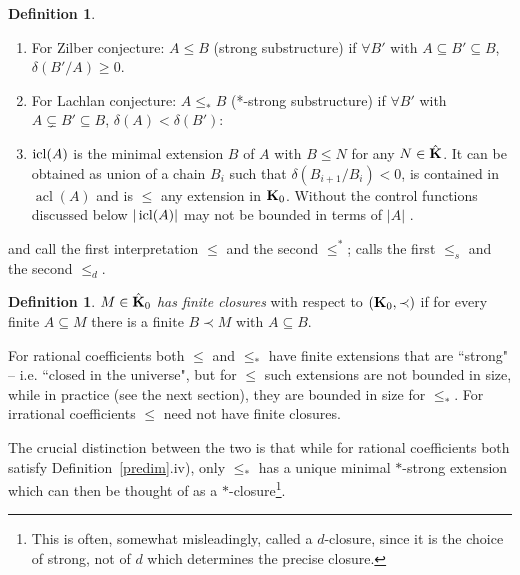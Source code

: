 \documentclass[11pt]{amsart}
\def\bK{{\bf K}}
\def\icl{\mathop{\rm icl}}
\DeclareMathOperator{\acl}{acl}
\theoremstyle{definition}
\newtheorem{definition}[theorem]{Definition}
\theoremstyle{remark}
\numberwithin{equation}{section}
\begin{document}
\begin{definition}\label{defsstr} \begin{enumerate}


     \item For Zilber conjecture: $A\leq B $ (strong substructure) if $\forall B'$ with $A\subseteq B' \subseteq B$, $
         \delta ( B'/ A)\geq 0$.




\item For Lachlan conjecture: $A \leq_* B$ (*-strong substructure) if
    $\forall
    B'$
    with
    $A\subsetneq B' \subseteq
    B$, $\delta(A) < \delta(B')$:

    \item   $\icl(A)$ is the
minimal extension $B$ of $A$ with $B \leq N$ for any $N\in \hat \bK$. It can
be obtained as union of a chain $B_i$ such that $\delta(B_{i+1}/B_i) < 0$, is
contained in $\acl(A)$ and is $\leq $ any extension in $\bK_0$.  Without the
control functions discussed below $|\icl(A)|$ may not be bounded in terms of
$|A|$ \cite{BaldwinShiJapan,BaldwinShelahran, Laskowax}.

\end{enumerate}
\end{definition}

\cite{BaldwinShiJapan} and \cite[p 159]{Ev02} call the first interpretation $\leq$ and the second
$\leq^*$; \cite{Evansmini} calls  the first $\leq_s$ and the second $\leq_d$.





\begin{definition}\label{deffc} $M\in \hat \bK_0$ {\em has finite closures} with respect to $(\bK_0,\prec)$  if
for every finite $A \subseteq M$ there is a finite $B \prec M$ with $A
\subseteq B$.
\end{definition}

For rational coefficients both $\leq$ and $\leq_*$ have finite extensions
that are ``strong" -- i.e. ``closed in the universe", but for $\leq$ such
extensions are not bounded in size, while in practice (see the next section), they are bounded in size for $\leq_*$. For
irrational coefficients $\leq$ need not have finite closures.

The crucial distinction between the two is that while for rational
coefficients both satisfy Definition~\ref{predim}.iv), only $\leq_*$  has a
unique minimal $*$-strong extension which can then be thought of as a
$*$-closure\footnote{This is often,  somewhat misleadingly, called a
$d$-closure, since it is the choice of strong, not of $d$ which determines
the precise closure.}.
\end{document}
